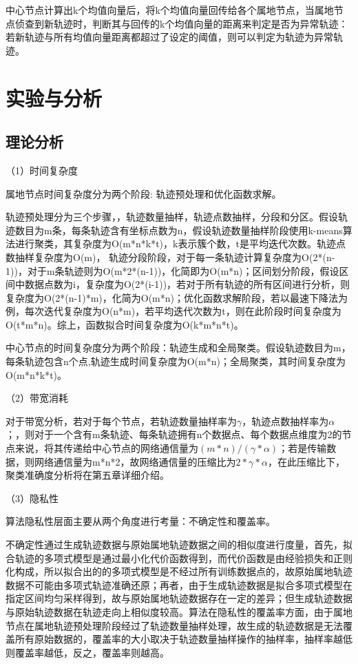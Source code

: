 中心节点计算出k个均值向量后，将k个均值向量回传给各个属地节点，当属地节点侦查到新轨迹时，判断其与回传的k个均值向量的距离来判定是否为异常轨迹：若新轨迹与所有均值向量距离都超过了设定的阈值，则可以判定为轨迹为异常轨迹。


\section{实验与分析}

\subsection{理论分析}

（1）时间复杂度

属地节点时间复杂度分为两个阶段: 轨迹预处理和优化函数求解。

轨迹预处理分为三个步骤，，轨迹数量抽样，轨迹点数抽样，分段和分区。假设轨迹数目为m条，每条轨迹含有坐标点数为n，假设轨迹数量抽样阶段使用k-means算法进行聚类，其复杂度为O(m*n*k*t)，k表示簇个数，t是平均迭代次数。轨迹点数抽样复杂度为O(m)，
轨迹分段阶段，对于每一条轨迹计算复杂度为O(2*(n-1))，对于m条轨迹则为O(m*2*(n-1))，化简即为O(m*n)；区间划分阶段，假设区间中数据点数为i，复杂度为O(2*(i-1))，若对于所有轨迹的所有区间进行分析，则复杂度为O(2*(n-1)*m)，化简为O(m*n)；优化函数求解阶段，若以最速下降法为例，每次迭代复杂度为O(n*m)，若平均迭代次数为t，则在此阶段时间复杂度为O(t*m*n)。综上，函数拟合时间复杂度为O(k*m*n*t)。

中心节点的时间复杂度分为两个阶段：轨迹生成和全局聚类。假设轨迹数目为m，每条轨迹包含n个点,轨迹生成时间复杂度为O(m*n)；全局聚类，其时间复杂度为O(m*n*k*t)。

（2）带宽消耗

对于带宽分析，若对于每个节点，若轨迹数量抽样率为$\gamma$，轨迹点数抽样率为$\alpha$；，则对于一个含有m条轨迹、每条轨迹拥有n个数据点、每个数据点维度为2的节点来说，将其传递给中心节点的网络通信量为$(m*n)/(\gamma*\alpha)$；若是传输数据，则网络通信量为m*n*2，故网络通信量的压缩比为$2*\gamma*\alpha$，在此压缩比下，聚类准确度分析将在第五章详细介绍。

（3）隐私性

算法隐私性层面主要从两个角度进行考量：不确定性和覆盖率。

不确定性通过生成轨迹数据与原始属地轨迹数据之间的相似度进行度量，首先，拟合轨迹的多项式模型是通过最小化代价函数得到，而代价函数是由经验损失和正则化构成，所以拟合出的的多项式模型是不经过所有训练数据点的，故原始属地轨迹数据不可能由多项式轨迹准确还原；再者，由于生成轨迹数据是拟合多项式模型在指定区间均匀采样得到，故与原始属地轨迹数据存在一定的差异；但生成轨迹数据与原始轨迹数据在轨迹走向上相似度较高。算法在隐私性的覆盖率方面，由于属地节点在属地轨迹预处理阶段经过了轨迹数量抽样处理，故生成的轨迹数据是无法覆盖所有原始数据的，覆盖率的大小取决于轨迹数量抽样操作的抽样率，抽样率越低则覆盖率越低，反之，覆盖率则越高。

